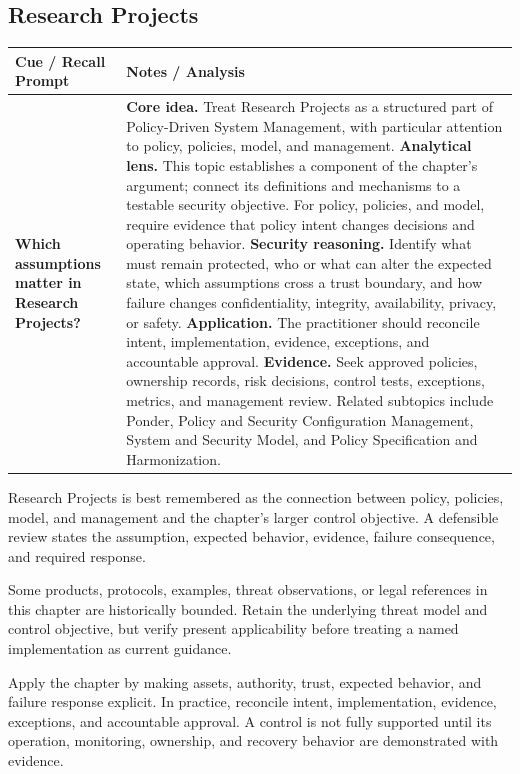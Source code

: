 \documentclass[11pt]{article}
\newcommand{\CornellHeader}{%
\rowcolor{Navy}\color{white}\bfseries Cue / Recall Prompt & \color{white}\bfseries Notes / Analysis\\\hline}
\newcommand{\CornellRow}[2]{%
\cellcolor{CueGray}\RaggedRight\textbf{#1} & \RaggedRight #2\\\hline}
\begin{document}
\subsection*{Research Projects}
\begin{longtable}{>{\RaggedRight\arraybackslash}p{}|>{\RaggedRight\arraybackslash}p{}}
\CornellHeader
\CornellRow{Which assumptions matter in Research Projects?}{\textbf{Core idea.} Treat Research Projects as a structured part of Policy-Driven System Management, with particular attention to policy, policies, model, and management. \textbf{Analytical lens.} This topic establishes a component of the chapter's argument; connect its definitions and mechanisms to a testable security objective. For policy, policies, and model, require evidence that policy intent changes decisions and operating behavior. \textbf{Security reasoning.} Identify what must remain protected, who or what can alter the expected state, which assumptions cross a trust boundary, and how failure changes confidentiality, integrity, availability, privacy, or safety. \textbf{Application.} The practitioner should reconcile intent, implementation, evidence, exceptions, and accountable approval. \textbf{Evidence.} Seek approved policies, ownership records, risk decisions, control tests, exceptions, metrics, and management review. Related subtopics include Ponder, Policy and Security Configuration Management, System and Security Model, and Policy Specification and Harmonization.}
\end{longtable}
\begin{topicsummary}
Research Projects is best remembered as the connection between policy, policies, model, and management and the chapter's larger control objective. A defensible review states the assumption, expected behavior, evidence, failure consequence, and required response.
\end{topicsummary}
\begin{historybox}
Some products, protocols, examples, threat observations, or legal references in this chapter are historically bounded. Retain the underlying threat model and control objective, but verify present applicability before treating a named implementation as current guidance.
\end{historybox}
\begin{defensebox}
Apply the chapter by making assets, authority, trust, expected behavior, and failure response explicit. In practice, reconcile intent, implementation, evidence, exceptions, and accountable approval. A control is not fully supported until its operation, monitoring, ownership, and recovery behavior are demonstrated with evidence.
\end{defensebox}
\end{document}
